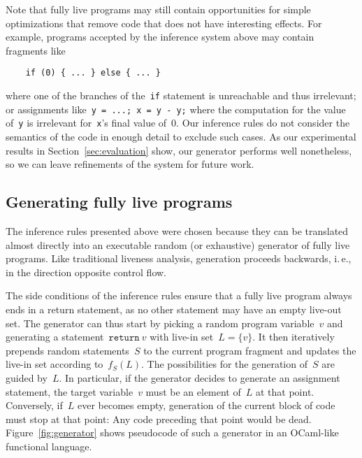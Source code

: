 \documentclass{llncs}
\begin{document}
Note that fully live programs may still contain opportunities for simple
optimizations that remove code that does not have interesting effects. For
example, programs accepted by the inference system above may contain
fragments like
\begin{verbatim}
    if (0) { ... } else { ... }
\end{verbatim}
where one of the branches of the~\verb|if| statement is unreachable and thus
irrelevant; or assignments like~\verb|y = ...; x = y - y;| where the
computation for the value of~\verb|y| is irrelevant for~\verb|x|'s final
value of~0. Our inference rules do not consider the semantics of the code in
enough detail to exclude such cases. As our experimental results in
Section~\ref{sec:evaluation} show, our generator performs well nonetheless,
so we can leave refinements of the system for future work.


\subsection{Generating fully live programs}

The inference rules presented above were chosen because they can be
translated almost directly into an executable random (or exhaustive)
generator of fully live programs. Like traditional liveness analysis,
generation proceeds backwards, i.\,e., in the direction opposite control
flow.

The side conditions of the inference rules ensure that a fully live program
always ends in a return statement, as no other statement may have an empty
live-out set. The generator can thus start by picking a random program
variable~\(v\) and generating a statement~\(\mathtt{return}\ v\) with
live-in set~\(L = \{v\}\). It then iteratively prepends random
statements~\(S\) to the current program fragment and updates the live-in set
according to~\(f_S(L)\). The possibilities for the generation of~\(S\) are
guided by~\(L\). In particular, if the generator decides to generate an
assignment statement, the target variable~\(v\) must be an element of~\(L\)
at that point. Conversely, if~\(L\) ever becomes empty, generation of the
current block of code must stop at that point: Any code preceding that point
would be dead. Figure~\ref{fig:generator} shows pseudocode of such a
generator in an OCaml-like functional language.
\end{document}
